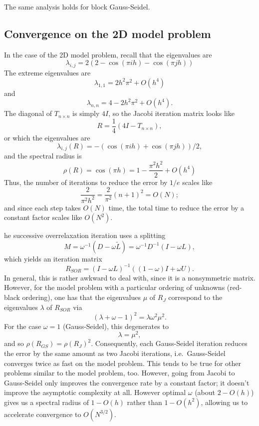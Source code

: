 \documentclass[12pt, leqno]{article} %
\begin{document}
The same analysis holds for block Gauss-Seidel.

\subsection{Convergence on the 2D model problem}

In the case of the 2D model problem, recall that the eigenvalues are
\[
  \lambda_{i,j} =
  2\left(
    2-\cos(\pi i h)-\cos (\pi j h)
  \right)
\]
The extreme eigenvalues are
\[
  \lambda_{1,1} = 2 h^2 \pi^2 + O(h^4)
\]
and
\[
  \lambda_{n,n} = 4-2 h^2 \pi^2 + O(h^4).
\]
The diagonal of $T_{n\times n}$ is simply $4I$, so the Jacobi
iteration matrix looks like
\[
  R = \frac{1}{4} (4I-T_{n\times n}),
\]
or which the eigenvalues are
\[
  \lambda_{i,j}(R) = -(\cos(\pi i h)+\cos(\pi j h))/2,
\]
and the spectral radius is
\[
  \rho(R) = \cos(\pi h) = 1-\frac{\pi^2 h^2}{2} + O(h^4)
\]
Thus, the number of iterations to reduce the error by $1/e$ scales like
\[
  \frac{2}{\pi^2 h^2} = \frac{2}{\pi^2} (n+1)^2 = O(N);
\]
and since each step takes $O(N)$ time, the total time to reduce the
error by a constant factor scales like $O(N^2)$.

he successive overrelaxation iteration uses a splitting
\[
  M = \omega^{-1} (D - \omega \tilde{L}) = \omega^{-1} D^{-1} (I-\omega L),
\]
which yields an iteration matrix
\[
  R_{SOR} = (I-\omega L)^{-1} ( (1-\omega) I + \omega U).
\]
In general, this is rather awkward to deal with, since it is a
nonsymmetric matrix.  However, for the model problem with a particular
ordering of unknowns (red-black ordering), one has that the
eigenvalues $\mu$ of $R_{J}$ correspond to the eigenvalues $\lambda$
of $R_{SOR}$ via
\[
  (\lambda + \omega - 1)^2 = \lambda \omega^2 \mu^2.
\]
For the case $\omega = 1$ (Gauss-Seidel), this degenerates to
\[
  \lambda = \mu^2,
\]
and so $\rho(R_{GS}) = \rho(R_J)^2$.  Consequently, each Gauss-Seidel
iteration reduces the error by the same amount as two Jacobi
iterations, i.e.~Gauss-Seidel converges twice as fast on the model
problem.  This tends to be true for other problems similar to the
model problem, too.  However, going from Jacobi to Gauss-Seidel only
improves the convergence rate by a constant factor; it doesn't improve
the asymptotic complexity at all.  However optimal $\omega$ (about $2 -
O(h)$) gives us a spectral radius of $1-O(h)$ rather than $1-O(h^2)$,
allowing us to accelerate convergence to $O(N^{3/2})$.
\end{document}
